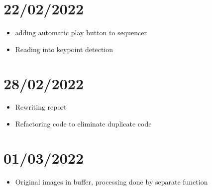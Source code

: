 \section{22/02/2022}
\begin{itemize}
    \item adding automatic play button to sequencer
    \item Reading into keypoint detection
\end{itemize}

\section{28/02/2022}
\begin{itemize}
    \item Rewriting report
    \item Refactoring code to eliminate duplicate code
\end{itemize}

\section{01/03/2022}
\begin{itemize}
    \item Original images in buffer, processing done by separate function
\end{itemize}